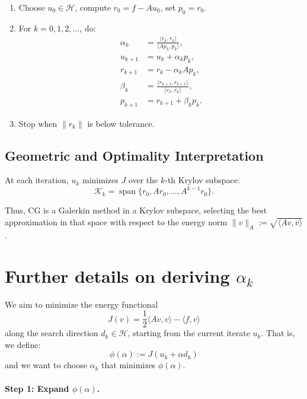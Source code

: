 \documentclass[12pt]{article}
\begin{document}
\begin{enumerate}[label=(\arabic*)]
    \item Choose \( u_0 \in \mathcal{H} \), compute \( r_0 = f - A u_0 \), set \( p_0 = r_0 \).
    
    \item For \( k = 0, 1, 2, \dots \), do:
    \begin{align*}
    \alpha_k &= \frac{\langle r_k, r_k \rangle}{\langle A p_k, p_k \rangle}, \\
    u_{k+1} &= u_k + \alpha_k p_k, \\
    r_{k+1} &= r_k - \alpha_k A p_k, \\
    \beta_k &= \frac{\langle r_{k+1}, r_{k+1} \rangle}{\langle r_k, r_k \rangle}, \\
    p_{k+1} &= r_{k+1} + \beta_k p_k.
    \end{align*}
    
    \item Stop when \( \| r_k \| \) is below tolerance.
\end{enumerate}

\subsection{Geometric and Optimality Interpretation}

At each iteration, \( u_k \) minimizes \( J \) over the \( k \)-th Krylov subspace:
\[
\mathcal{K}_k = \operatorname{span}\{r_0, A r_0, \dots, A^{k-1} r_0\}.
\]

Thus, CG is a Galerkin method in a Krylov subspace, selecting the best approximation in that space with respect to the energy norm \( \| v \|_A := \sqrt{\langle A v, v \rangle} \).


\section{Further details on deriving \(\alpha_k\)}

We aim to minimize the energy functional
\[
J(v) = \frac{1}{2} \langle A v, v \rangle - \langle f, v \rangle
\]
along the search direction \( d_k \in \mathcal{H} \), starting from the current iterate \( u_k \). That is, we define:
\[
\phi(\alpha) := J(u_k + \alpha d_k)
\]
and we want to choose \( \alpha_k \) that minimizes \( \phi(\alpha) \).

\paragraph{Step 1: Expand \( \phi(\alpha) \).}
\end{document}
